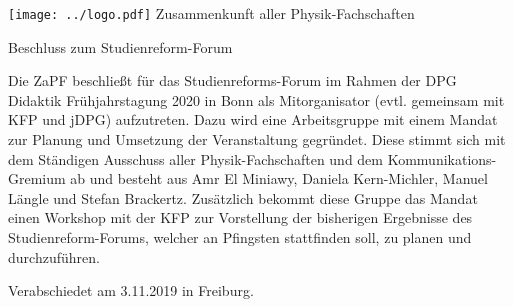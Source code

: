 \documentclass[DIV=calc]{scrartcl}
\begin{document}
\hspace{0.87\textwidth}
\begin{minipage}{120pt}
  \vspace{-1.8cm}
  \texttt{[image: ../logo.pdf]}
  \centering
  \small Zusammenkunft aller Physik-Fachschaften
\end{minipage}
\begin{center}
  \vspace{1cm}
  \huge{Beschluss zum Studienreform-Forum} \\
  \normalsize
\end{center}
\vspace{1cm}

 Die ZaPF beschließt für das Studienreforms-Forum im Rahmen der DPG Didaktik Frühjahrstagung 2020 in Bonn als Mitorganisator (evtl. gemeinsam mit KFP und jDPG) aufzutreten.  Dazu wird eine Arbeitsgruppe mit einem Mandat zur Planung und Umsetzung der Veranstaltung gegründet. Diese stimmt sich mit dem Ständigen Ausschuss aller Physik-Fachschaften und dem Kommunikations-Gremium ab und besteht aus Amr El Miniawy, Daniela Kern-Michler, Manuel Längle und Stefan Brackertz. Zusätzlich bekommt diese Gruppe das Mandat einen Workshop mit der KFP zur Vorstellung der bisherigen Ergebnisse des Studienreform-Forums, welcher an Pfingsten stattfinden soll, zu planen und durchzuführen.

\vspace{1cm}

\vfill
\begin{flushright}
Verabschiedet am 3.11.2019 in Freiburg.
\end{flushright}
\end{document}

